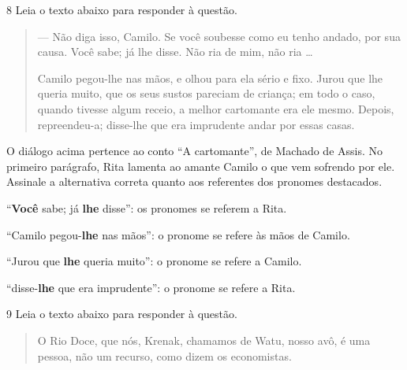 \num{8} Leia o texto abaixo para responder à questão. 


\begin{quote}

--- Não diga isso, Camilo. Se você soubesse como eu tenho andado, por sua
causa. Você sabe; já lhe disse. Não ria de mim, não ria \ldots{}

Camilo pegou-lhe nas mãos, e olhou para ela sério e fixo. Jurou que lhe
queria muito, que os seus sustos pareciam de criança; em todo o caso,
quando tivesse algum receio, a melhor cartomante era ele mesmo. Depois,
repreendeu-a; disse-lhe que era imprudente andar por essas casas.

\end{quote}


O diálogo acima pertence ao conto ``A cartomante'', de Machado de Assis.
No primeiro parágrafo, Rita lamenta ao amante Camilo o que vem 
sofrendo por ele. Assinale a alternativa correta quanto aos 
referentes dos pronomes destacados.  

\begin{escolha}

  \item ``\textbf{Você} sabe; já \textbf{lhe} disse'': os pronomes se referem a Rita.
  
  \item ``Camilo pegou-\textbf{lhe} nas mãos'': o pronome se refere às mãos de Camilo.
  
  \item ``Jurou que \textbf{lhe} queria muito'': o pronome se refere a Camilo.
  
  \item ``disse-\textbf{lhe} que era imprudente'': o pronome se refere a Rita.

\end{escolha}

\num{9} Leia o texto abaixo para responder à questão.

\begin{quote}

O Rio Doce, que nós, Krenak, chamamos de Watu, nosso avô, é uma pessoa,
não um recurso, como dizem os economistas.

\end{quote}

